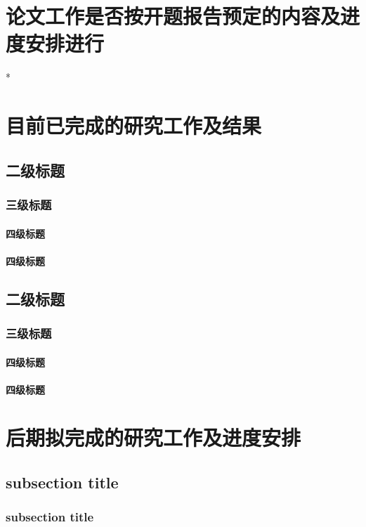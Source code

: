 \section{论文工作是否按开题报告预定的内容及进度安排进行}*

\lipsum[1]

\section{目前已完成的研究工作及结果}

\subsection{二级标题}
\subsubsection{三级标题}
\paragraph{四级标题}
\lipsum[2]
\paragraph{四级标题}
\lipsum[3]

\subsection{二级标题}
\subsubsection{三级标题}
\paragraph{四级标题}
\lipsum[2]
\paragraph{四级标题}
\lipsum[3]

\section{后期拟完成的研究工作及进度安排}

\subsection{subsection title}
\subsubsection{subsection title}
\lipsum[2-3]

